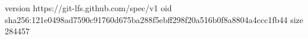 version https://git-lfs.github.com/spec/v1
oid sha256:121e0498ad7590c91760d675ba288f5ebff298f20a516b0f8a8804a4ccc1fb44
size 284457
